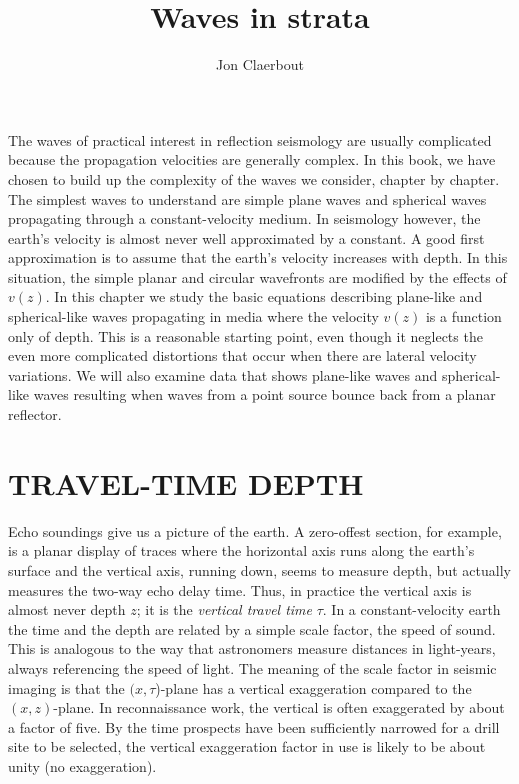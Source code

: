 \def\CAKEDIR{.}

\title{Waves in strata}
\author{Jon Claerbout}
\label{paper:wvs}
\maketitle

\def\RMS{{{\sc rms}}}   %

\def\RMS{{\rm RMS}}     %

The waves of practical interest in reflection seismology are usually complicated
because the propagation velocities are generally complex.
In this book, we have chosen to build up the complexity of the waves we
consider, chapter by chapter.  The simplest waves to understand are simple
plane waves and spherical waves propagating through a constant-velocity medium.
In seismology however, the earth's velocity is almost never well approximated
by a constant.
A good first approximation is to assume that the earth's
velocity increases with depth.
In this situation, the simple planar and circular wavefronts
are modified by the effects of $v(z)$.
In this chapter we study the basic equations describing plane-like
and spherical-like waves propagating
in media where the velocity $v(z)$ is a function only of depth.
This is a reasonable starting point,
even though it neglects the even more complicated distortions that occur
when there are lateral velocity variations.
We will also examine data that shows plane-like waves
and spherical-like waves resulting when waves
from a point source bounce back from a planar reflector.

\section{TRAVEL-TIME DEPTH}
\par
Echo soundings give us a picture of the earth.
A zero-offest section, for example,
is a planar display of traces where the horizontal axis runs along
the earth's surface
and the vertical axis, running down, seems to measure depth,
but actually measures the two-way echo delay time.
Thus, in practice the vertical axis is almost never depth $z$;
it is the
{\em
vertical travel time
}
$ \tau $.
In a constant-velocity earth
the time and the depth are related
by a simple scale factor, the speed of sound.  This is analogous to the
way that astronomers measure distances in light-years, always referencing
the speed of light.
The meaning of the scale factor in seismic imaging
is that the  $(x, \tau$)-plane
has a vertical exaggeration compared to the  $(x,z)$-plane.
In reconnaissance work,
the vertical is often exaggerated by about a factor of five.
By the time prospects have been sufficiently narrowed for a drill
site to be selected,
the vertical exaggeration factor in use is likely to be about unity
(no exaggeration).

